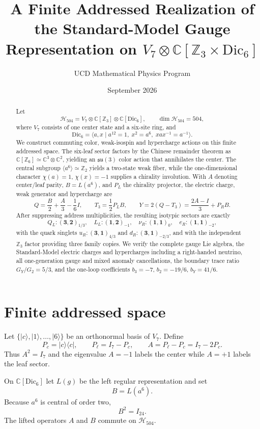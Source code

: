 \documentclass[11pt]{article}
\title{A Finite Addressed Realization of the Standard-Model Gauge Representation on $V_7\otimes\mathbb C[\mathbb Z_3\times\mathrm{Dic}_6]$}
\author{UCD Mathematical Physics Program}
\date{September 2026}
\theoremstyle{definition}\newtheorem{definition}[theorem]{Definition}
\theoremstyle{remark}\newtheorem{remark}[theorem]{Remark}
\begin{document}
\maketitle

\begin{abstract}
Let
\[
\mathcal H_{504}=V_7\otimes\mathbb C[\mathbb Z_3]\otimes\mathbb C[\mathrm{Dic}_6],
\qquad \dim \mathcal H_{504}=504,
\]
where $V_7$ consists of one center state and a six-site ring, and
\[
\mathrm{Dic}_6=\langle a,x\mid a^{12}=1,\;x^2=a^6,\;xax^{-1}=a^{-1}\rangle.
\]
We construct commuting color, weak-isospin and hypercharge actions on this finite addressed space.  The six-leaf sector factors by the Chinese remainder theorem as $\mathbb C[\mathbb Z_6]\simeq\mathbb C^3\otimes\mathbb C^2$, yielding an $\mathfrak{su}(3)$ color action that annihilates the center.  The central subgroup $\langle a^6\rangle\simeq\mathbb Z_2$ yields a two-state weak fiber, while the one-dimensional character $\chi(a)=1$, $\chi(x)=-1$ supplies a chirality involution.  With $A$ denoting center/leaf parity, $B=L(a^6)$, and $P_L$ the chirality projector, the electric charge, weak generator and hypercharge are
\[
Q=\frac{B}{2}+\frac{A}{3}-\frac16 I,
\qquad
T_3=\frac12 P_LB,
\qquad
Y=2(Q-T_3)=\frac{2A-I}{3}+P_RB.
\]
After suppressing address multiplicities, the resulting isotypic sectors are exactly
\[
Q_L:(\mathbf3,\mathbf2)_{1/3},\quad
L_L:(\mathbf1,\mathbf2)_{-1},\quad
\nu_R:(\mathbf1,\mathbf1)_0,\quad
e_R:(\mathbf1,\mathbf1)_{-2},
\]
with the quark singlets $u_R:(\mathbf3,\mathbf1)_{4/3}$ and $d_R:(\mathbf3,\mathbf1)_{-2/3}$, and with the independent $\mathbb Z_3$ factor providing three family copies.  We verify the complete gauge Lie algebra, the Standard-Model electric charges and hypercharges including a right-handed neutrino, all one-generation gauge and mixed anomaly cancellations, the boundary trace ratio $G_Y/G_2=5/3$, and the one-loop coefficients $b_3=-7$, $b_2=-19/6$, $b_Y=41/6$.
\end{abstract}

\section{Finite addressed space}
Let $\{|c\rangle,|1\rangle,\ldots,|6\rangle\}$ be an orthonormal basis of $V_7$. Define
\[
P_c=|c\rangle\langle c|,\qquad P_\ell=I_7-P_c,
\qquad A=P_\ell-P_c=I_7-2P_c.
\]
Thus $A^2=I_7$ and the eigenvalue $A=-1$ labels the center while $A=+1$ labels the leaf sector.

On $\mathbb C[\mathrm{Dic}_6]$ let $L(g)$ be the left regular representation and set
\[
B=L(a^6).
\]
Because $a^6$ is central of order two,
\[
B^2=I_{24}.
\]
The lifted operators $A$ and $B$ commute on $\mathcal H_{504}$.
\end{document}
